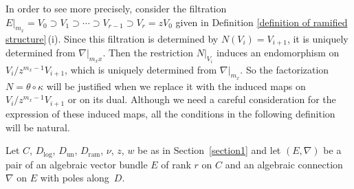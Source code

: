 \documentclass[pdftex]{sigma}
\numberwithin{equation}{section}
\begin{document}
In order to see more precisely,
consider the filtration
$E|_{m_x}=V_0\supset V_1\supset\cdots\supset V_{r-1}\supset V_r=zV_0$
given in Definition \ref{definition of ramified structure}\,(i).
Since this filtration is determined by $N(V_i)=V_{i+1}$,
it is uniquely determined from $\nabla|_{m_xx}$.
Then the restriction $N|_{V_i}$ induces an endomorphism on $V_i/z^{m_x-1}V_{i+1}$,
which is uniquely determined from $\nabla|_{m_x}$.
So the factorization $N=\theta\circ\kappa$ will be justified when we replace it
with the induced maps on $V_i/z^{m_x-1}V_{i+1}$ or on its dual.
Although we need a careful consideration for the expression
of these induced maps, all the conditions in the following definition will be natural.

Let $C$, $D_{\mathrm{log}}$, $D_{\mathrm{un}}$, $D_{\mathrm{ram}}$, $\nu$, $z$, $w$ be as in Section~\ref{section1}
and let $(E,\nabla)$ be a pair of an algebraic vector bundle $E$ of rank $r$ on $C$ and
an algebraic connection $\nabla$ on $E$ with poles along~$D$.
\end{document}
